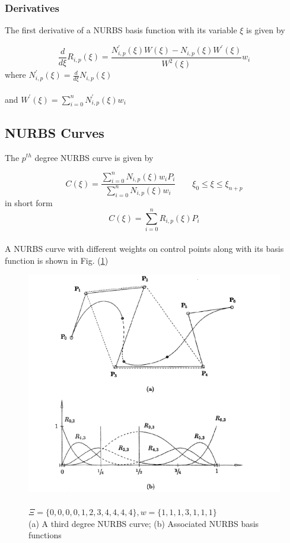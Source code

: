 \documentclass[11pt]{article}
\begin{document}
\subsubsection{Derivatives}
The first derivative of a NURBS basis function with its variable $\xi$ is given by \cite{nguyen2012introduction}

\begin{equation}
\frac{d }{d \xi} R_{i,p}(\xi) = \frac{N^{'}_{i,p}(\xi)  W(\xi) - N_{i,p}(\xi) 
	W^{'}(\xi)}{W^{2}(\xi)}w_{i}
\end{equation}
\noindent
where
$N^{'}_{i,p}(\xi) = \frac{d }{d \xi} N_{i,p}(\xi)$  \\
\\
\noindent
and $W^{'}(\xi) =  \sum_{i=0}^{n}N^{'}_{i,p}(\xi) w_i$


\subsection{NURBS Curves }
The $p^{th}$ degree NURBS curve is given by \cite{piegl2012nurbs}

\begin{equation}
C(\xi) =
\frac{\sum_{i=0}^{n}N_{i,p}(\xi)w_{i}P_{i}}{\sum_{i=0}^{n}N_{i,p}(\xi)w_{i}}
\qquad \xi_0 \leq \xi \leq \xi_{n+p}
\end{equation}
in short form
\begin{equation}
C(\xi) = \sum_{i=0}^{n}R_{i,p}(\xi)P_{i}
\end{equation}
\\
A NURBS curve with different weights on control points along with its basis function is shown in Fig. (\ref{NURBSCurveBasisFunctions})
\begin{figure}[H]
	\begin{center}
		\includegraphics[scale=0.7]{NURBSCurveBasisFunctions.png} 
		\caption{\\$\Xi=\{0,0,0,0,1,2,3,4,4,4,4\}, w = \{1,1,1,3,1,1,1\}$\\(a) A third degree NURBS curve; (b) Associated NURBS basis functions \cite{piegl2012nurbs}}\label{NURBSCurveBasisFunctions}
	\end{center}	
\end{figure}
\end{document}
